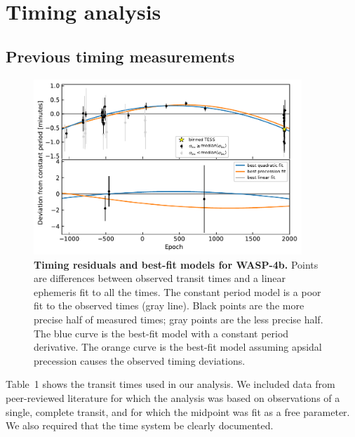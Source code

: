 \documentclass[12pt,twocolumn,tighten]{aastex62}
\begin{document}
\section{Timing analysis}
\label{sec:timing}

\subsection{Previous timing measurements}
\label{subsec:times}

\begin{figure}[t]
    \begin{center}
        \leavevmode
        \includegraphics[width=0.9\textwidth]{f3.pdf}
    \end{center}
    \vspace{-0.5cm}
    \caption{
        {\bf Timing residuals and best-fit models for WASP-4b.}
        Points are differences between observed transit times and a
        linear ephemeris fit to all the times.  The constant period
        model is a poor fit to the observed times (gray line).  Black
        points are the more precise half of measured times; gray points
        are the less precise half.  The blue curve is the best-fit model
        with a constant period derivative.  The orange curve is the
        best-fit model assuming apsidal precession causes the observed
        timing deviations.
        \label{fig:times}
    }
\end{figure}

Table~1 shows the transit times used in our analysis.  We included
data from peer-reviewed literature for which the analysis was based on
observations of a single, complete transit, and for which the midpoint
was fit as a free parameter. We also required that the time system be
clearly documented.
\end{document}
